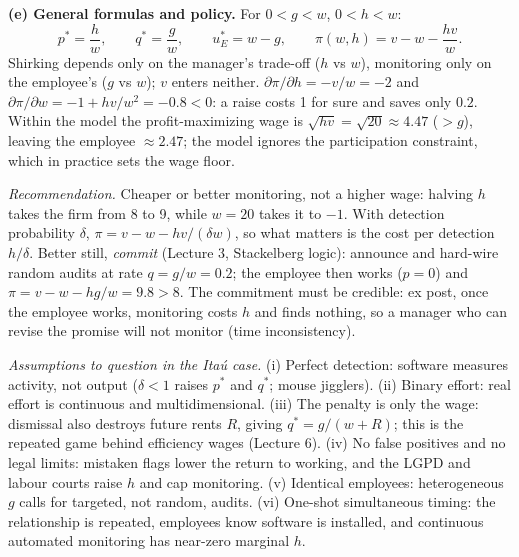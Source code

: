 \documentclass[10pt,a4paper]{article}
\begin{document}
\textbf{(e) General formulas and policy.} For $0 < g < w$, $0 < h < w$:
\[
p^* = \frac{h}{w}, \qquad q^* = \frac{g}{w}, \qquad u_E^* = w - g, \qquad
\pi(w, h) = v - w - \frac{hv}{w}.
\]
Shirking depends only on the manager's trade-off ($h$ vs $w$), monitoring only on the employee's
($g$ vs $w$); $v$ enters neither. $\partial\pi/\partial h = -v/w = -2$ and
$\partial\pi/\partial w = -1 + hv/w^2 = -0.8 < 0$: a raise costs 1 for sure and saves only $0.2$.
Within the model the profit-maximizing wage is $\sqrt{hv} = \sqrt{20} \approx 4.47$ ($> g$),
leaving the employee $\approx 2.47$; the model ignores the participation constraint, which in
practice sets the wage floor.

\emph{Recommendation.} Cheaper or better monitoring, not a higher wage: halving $h$ takes the firm
from 8 to 9, while $w = 20$ takes it to $-1$. With detection probability $\delta$,
$\pi = v - w - hv/(\delta w)$, so what matters is the cost per detection $h/\delta$. Better still,
\emph{commit} (Lecture 3, Stackelberg logic): announce and hard-wire random audits at rate
$q = g/w = 0.2$; the employee then works ($p = 0$) and $\pi = v - w - hg/w = 9.8 > 8$. The
commitment must be credible: ex post, once the employee works, monitoring costs $h$ and finds nothing,
so a manager who can revise the promise will not monitor (time inconsistency).

\emph{Assumptions to question in the Itaú case.}
(i) Perfect detection: software measures activity, not output ($\delta < 1$ raises $p^*$ and $q^*$;
mouse jigglers). (ii) Binary effort: real effort is continuous and multidimensional. (iii) The penalty
is only the wage: dismissal also destroys future rents $R$, giving $q^* = g/(w + R)$; this is the
repeated game behind efficiency wages (Lecture 6). (iv) No false positives and no legal limits:
mistaken flags lower the return to working, and the LGPD and labour courts raise $h$ and cap
monitoring. (v) Identical employees: heterogeneous $g$ calls for targeted, not random, audits.
(vi) One-shot simultaneous timing: the relationship is repeated, employees know software is
installed, and continuous automated monitoring has near-zero marginal $h$.
\end{document}
